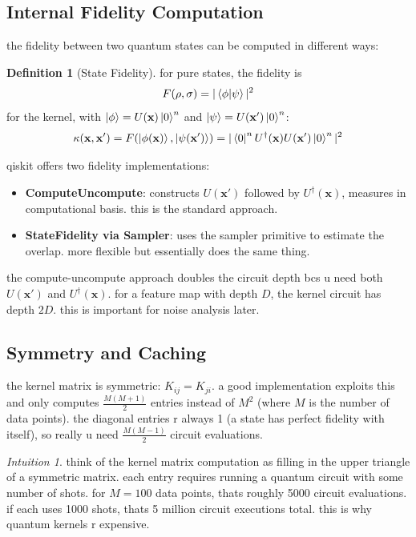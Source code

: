 \documentclass[11pt,a4paper]{article}
\theoremstyle{definition}
\newtheorem{definition}{Definition}[section]
\theoremstyle{remark}
\newtheorem*{intuition}{Intuition}
\begin{document}
\subsection{Internal Fidelity Computation}

the fidelity between two quantum states can be computed in different ways:

\begin{definition}[State Fidelity]
for pure states, the fidelity is
\[
F(\rho, \sigma) = |\braket{\phi|\psi}|^2
\]
for the kernel, with $\ket{\phi} = U(\mathbf{x})\ket{0}^n$ and $\ket{\psi} = U(\mathbf{x}')\ket{0}^n$:
\[
\kappa(\mathbf{x}, \mathbf{x}') = F(\ket{\phi(\mathbf{x})}, \ket{\psi(\mathbf{x}')}) = |\bra{0}^n U^\dagger(\mathbf{x}) U(\mathbf{x}') \ket{0}^n|^2
\]
\end{definition}

qiskit offers two fidelity implementations:
\begin{itemize}[leftmargin=*]
    \item \textbf{ComputeUncompute}: constructs $U(\mathbf{x}')$ followed by $U^\dagger(\mathbf{x})$, measures in computational basis. this is the standard approach.
    \item \textbf{StateFidelity via Sampler}: uses the sampler primitive to estimate the overlap. more flexible but essentially does the same thing.
\end{itemize}

the compute-uncompute approach doubles the circuit depth bcs u need both $U(\mathbf{x}')$ and $U^\dagger(\mathbf{x})$. for a feature map with depth $D$, the kernel circuit has depth $2D$. this is important for noise analysis later.

\subsection{Symmetry and Caching}

the kernel matrix is symmetric: $K_{ij} = K_{ji}$. a good implementation exploits this and only computes $\frac{M(M+1)}{2}$ entries instead of $M^2$ (where $M$ is the number of data points). the diagonal entries r always 1 (a state has perfect fidelity with itself), so really u need $\frac{M(M-1)}{2}$ circuit evaluations.

\begin{intuition}
think of the kernel matrix computation as filling in the upper triangle of a symmetric matrix. each entry requires running a quantum circuit with some number of shots. for $M=100$ data points, thats roughly 5000 circuit evaluations. if each uses 1000 shots, thats 5 million circuit executions total. this is why quantum kernels r expensive.
\end{intuition}
\end{document}
